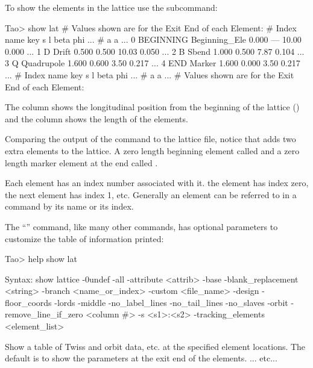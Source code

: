 \documentclass{hitec}     %
\begin{document}
To show the elements in the lattice use the  subcommand:
\begin{code}
Tao> show lat
# Values shown are for the Exit End of each Element:
# Index  name      key                      s       l    beta     phi ...  
#                                                           a       a ...
     0  BEGINNING Beginning_Ele         0.000     ---   10.00   0.000 ...
     1  D         Drift                 0.500   0.500   10.03   0.050 ...
     2  B         Sbend                 1.000   0.500    7.87   0.104 ...
     3  Q         Quadrupole            1.600   0.600    3.50   0.217 ...
     4  END       Marker                1.600   0.000    3.50   0.217 ...
# Index  name      key                      s       l    beta     phi ...  
#                                                           a       a ...
# Values shown are for the Exit End of each Element:
\end{code}
The  column shows the longitudinal position from the beginning of the lattice
() and the  column shows the length of the elements.

Comparing the output of the  command to the  lattice file, notice
that \bmad adds two extra elements to the lattice. A zero length beginning element called
 and a zero length marker element at the end called .

Each element has an index number associated with it. the  element has index zero, the
next element has index 1, etc. Generally an element can be referred to in a command by its name or
its index.

The ``'' command, like many other commands, has optional parameters to
customize the table of information printed:

\begin{code}
Tao> help show lat

Syntax:
  show lattice {-0undef} {-all} {-attribute <attrib>} {-base}
      {-blank_replacement <string>}  {-branch <name_or_index>}
      {-custom <file_name>} {-design} {-floor_coords} {-lords} {-middle}
      {-no_label_lines} {-no_tail_lines} {-no_slaves} {-orbit} 
      {-remove_line_if_zero <column #>} {-s <s1>:<s2>} {-tracking_elements}
      {<element_list>}

Show a table of Twiss and orbit data, etc. at the specified element locations. 
The default is to show the parameters at the exit end of the elements. 
... etc...
\end{code}
\end{document}
